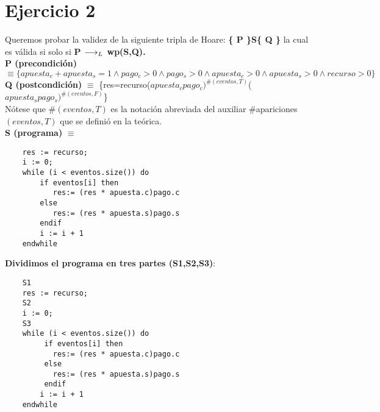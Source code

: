 \documentclass[10pt,a4paper]{article}
\begin{document}
\section{Ejercicio 2}
\begin{flushleft}
Queremos probar  la validez de la siguiente tripla de Hoare:
\textbf{\{ P \}S\{ Q \}} la cual es válida si solo si \textbf{{P $\longrightarrow _L$ wp(S,Q)}.}\\                                  
\vspace{3mm}
\textbf{P (precondición)} $\equiv \{ apuesta_c + apuesta_s =1 \wedge pago_c>0 \wedge pago_s>0 \wedge apuesta_c>0 \wedge apuesta_s>0 \wedge recurso>0\}$\\
\vspace{3mm}
\textbf{Q (postcondición)} $\equiv$ \{res=recurso($apuesta_cpago_c)^{\#(eventos,T)}$($apuesta_spago_s)^{\#(eventos,F)}$\}\\
\vspace{3mm}
Nótese que \#$(eventos, T)$ es la notación abreviada del auxiliar {\normalfont\ttfamily\#apariciones$(eventos, T)$} 
que se definió en la teórica. \\
\vspace{3mm}
\textbf{S (programa)} $\equiv$
\begin{lstlisting}
	res := recurso;
	i := 0;
	while (i < eventos.size()) do
	    if eventos[i] then
		   res:= (res * apuesta.c)pago.c
		else
		   res:= (res * apuesta.s)pago.s
		endif
		i := i + 1
	endwhile
\end{lstlisting} 

\vspace{3mm}
\textbf{Dividimos el programa en tres partes (S1,S2,S3)}:\\
\begin{lstlisting}
	S1
	res := recurso;
	S2
	i := 0;
	S3
	while (i < eventos.size()) do
	     if eventos[i] then
		   res:= (res * apuesta.c)pago.c
		 else
		   res:= (res * apuesta.s)pago.s
		 endif
		i := i + 1
	endwhile
		\end{lstlisting} 


\end{flushleft}
\end{document}

